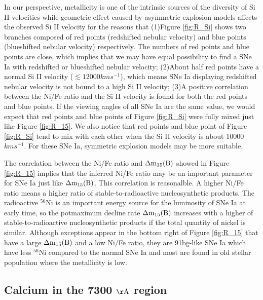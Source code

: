 \documentclass[twocolumn]{aastex631}
\begin{document}
In our perspective, metallicity is one of the intrinsic sources of the diversity of Si II velocities while geometric effect caused by asymmetric explosion models affects the observed Si II velocity for the reasons that (1)Figure \ref{fig:R_Si} shows two branches composed of red points (redshifted nebular velocity) and blue points (blueshifted nebular velocity) respectively. The numbers of red points and blue points are close, which implies that we may have equal possibility to find a SNe Ia with redshifted or blueshifted nebular velocity; (2)About half red points have a normal Si II velocity ($\lesssim 12000 km s^{-1}$), which means SNe Ia displaying redshifted nebular velocity is not bound to a high Si II velocity; (3)A positive correlation between the Ni/Fe ratio and the Si II velocity is found for both the red points and blue points. If the viewing angles of all SNe Ia are the same value, we would expect that red points and blue points of Figure \ref{fig:R_Si} were fully mixed just like Figure \ref{fig:R_15}. We also notice that red points and blue point of Figure \ref{fig:R_Si} tend to mix with each other when the Si II velocity is about 10000 $km s^{-1}$. For these SNe Ia, symmetric explosion models may be more suitable.

The correlation between the Ni/Fe ratio and $\rm {\Delta}m_{15}(B)$ showed in Figure \ref{fig:R_15} implies that the inferred Ni/Fe ratio may be an important parameter for SNe Ia just like $\rm {\Delta}m_{15}(B)$. This correlation is reasonalble. A higher Ni/Fe ratio means a higher ratio of stable-to-radioactive nucleosynthetic products. The radioactive $^{56}$Ni is an important energy source for the luminosity of SNe Ia at early time, so the potmaximum decline rate $\rm {\Delta}m_{15}(B)$ increases with a higher of stable-to-radioactive nucleosynthetic products if the total quantity of nickel is similar. Although exceptions appear in the bottom right of Figure \ref{fig:R_15} that have a large $\rm {\Delta}m_{15}(B)$ and a low Ni/Fe ratio, they are 91bg-like SNe Ia which have less $^{56}$Ni compared to the normal SNe Ia and most are found in old stellar population \citep{2019PASA...36...31P} where the metallicity is low.

\subsection{Calcium in the 7300 $\rm \AA$ region \label{subsec:Calcium}}
\end{document}
